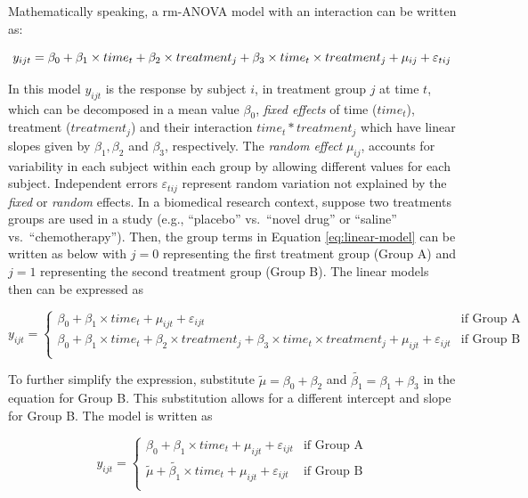 \documentclass[
]{article}
\begin{document}
Mathematically speaking, a rm-ANOVA model with an interaction can be written as:

\begin{equation}
y_{ijt} = \beta_0+ \beta_1 \times time_{t} + \beta_2 \times treatment_{j} + \beta_3 \times time_{t}\times treatment_{j}+\mu_{ij} +\varepsilon_{tij}\\ 
\label{eq:linear-model}
\end{equation}

In this model \(y_{ijt}\) is the response by subject \(i\), in treatment group \(j\) at time \(t\), which can be decomposed in a mean value \(\beta_0\), \emph{fixed effects} of time (\(time_t\)), treatment (\(treatment_j\)) and their interaction \(time_t*treatment_j\) which have linear slopes given by \(\beta_1, \beta_2\) and \(\beta_3\), respectively. The \emph{random effect} \(\mu_{ij}\), accounts for variability in each subject within each group by allowing different values for each subject. Independent errors \(\varepsilon_{tij}\) represent random variation not explained by the \emph{fixed} or \emph{random} effects.
In a biomedical research context, suppose two treatments groups are used in a study (e.g., ``placebo'' vs.~``novel drug'' or ``saline'' vs.~``chemotherapy''). Then, the group terms in Equation \eqref{eq:linear-model} can be written as below with \(j=0\) representing the first treatment group (Group A) and \(j=1\) representing the second treatment group (Group B). The linear models then can be expressed as

\begin{equation}
y_{ijt} = \begin{cases}
\beta_0 + \beta_1\times time_{t}+\mu_{ijt}+\varepsilon_{ijt}   & \mbox{if Group A}\\
\beta_0 + \beta_1 \times time_{t} + \beta_2 \times treatment_{j} +\beta_3 \times time_{t} \times treatment_{j}+\mu_{ijt}+\varepsilon_{ijt}  & \mbox{if Group B}\\
\end{cases}
\label{eq:ANOVA-by-group}
\end{equation}

To further simplify the expression, substitute \(\widetilde{\mu}=\beta_0+\beta_{2}\) and \(\widetilde{\beta_{1}}=\beta_{1}+\beta_{3}\) in the equation for Group B. This substitution allows for a different intercept and slope for Group B. The model is written as

\begin{equation}
y_{ijt} = \begin{cases}
\beta_0 + \beta_1\times time_{t}+\mu_{ijt}+\varepsilon_{ijt}   & \mbox{if Group A}\\
\widetilde{\mu} + \widetilde{\beta_1} \times time_{t} +\mu_{ijt}+\varepsilon_{ijt}  & \mbox{if Group B}\\
\end{cases}
\label{eq:ANOVA-lines}
\end{equation}
\end{document}
